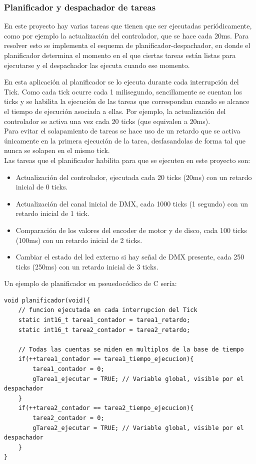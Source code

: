 \subsubsection{Planificador y despachador de tareas}
En este proyecto hay varias tareas que tienen que ser ejecutadas periódicamente, como por ejemplo la actualización del controlador, que se hace cada 20ms. Para resolver esto se implementa el esquema de planificador-despachador, en donde el planificador determina el momento en el que ciertas tareas están listas para ejecutarse y el despachador las ejecuta cuando ese momento.

En esta aplicación al planificador se lo ejecuta durante cada interrupción del Tick. Como cada tick ocurre cada 1 milisegundo, sencillamente se cuentan los ticks y se habilita la ejecución de las tareas que correspondan cuando se alcance el tiempo de ejecución asociada a ellas. Por ejemplo, la actualización del controlador se activa una vez cada 20 ticks (que equivalen a 20ms).\\
Para evitar el solapamiento de tareas se hace uso de un retardo que se activa únicamente en la primera ejecución de la tarea, desfasandolas de forma tal que nunca se solapen en el mismo tick. \\
Las tareas que el planificador habilita para que se ejecuten en este proyecto son:
\begin{itemize}
	\item Actualización del controlador, ejecutada cada 20 ticks (20ms) con un retardo inicial de 0 ticks.
	\item Actualización del canal inicial de DMX, cada 1000 ticks (1 segundo) con un retardo inicial de 1 tick.
	\item Comparación de los valores del encoder de motor y de disco, cada 100 ticks (100ms) con un retardo inicial de 2 ticks.
	\item Cambiar el estado del led externo si hay señal de DMX presente, cada 250 ticks (250ms) con un retardo inicial de 3 ticks.
\end{itemize}
Un ejemplo de planificador en pseuedocódico de C sería:
\begin{lstlisting}[style=CStyle]
void planificador(void){
	// funcion ejecutada en cada interrupcion del Tick
	static int16_t tarea1_contador = tarea1_retardo;
	static int16_t tarea2_contador = tarea2_retardo;
	
	// Todas las cuentas se miden en multiplos de la base de tiempo
	if(++tarea1_contador == tarea1_tiempo_ejecucion){
		tarea1_contador = 0;
		gTarea1_ejecutar = TRUE; // Variable global, visible por el despachador
	}
	if(++tarea2_contador == tarea2_tiempo_ejecucion){
		tarea2_contador = 0;
		gTarea2_ejecutar = TRUE; // Variable global, visible por el despachador
	}
}
\end{lstlisting}

